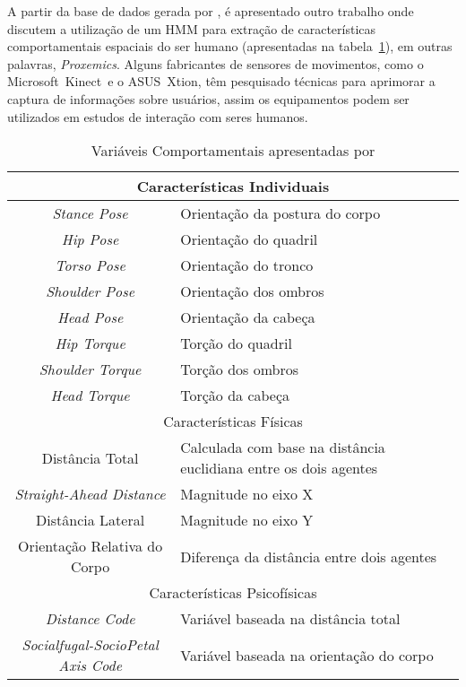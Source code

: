 A partir da base de dados gerada por \textcite{mead:2013b}, é apresentado outro trabalho onde \textcite{mead:2013} discutem a utilização de um HMM para extração de características comportamentais espaciais do ser humano (apresentadas na tabela~\ref{tab:variaveiscomportamentaismead}), em outras palavras, \emph{Proxemics}. Alguns fabricantes de sensores de movimentos, como o Microsoft\textregistered\ Kinect\textregistered\ e o ASUS\textregistered\ Xtion, têm pesquisado técnicas para aprimorar a captura de informações sobre usuários, assim os equipamentos podem ser utilizados em estudos de interação com seres humanos.

\begin{table}[!ht]
	\caption{Variáveis Comportamentais apresentadas por \textcite{mead:2013b}}
	\label{tab:variaveiscomportamentaismead}
	\centering
	\begin{tabular}{c | p{8 cm}}
		\hline
		\multicolumn{2}{c}{Características Individuais} \\
		\hline
		\emph{Stance Pose} & Orientação da postura do corpo \\
		\hline
		\emph{Hip Pose} & Orientação do quadril \\
		\hline
		\emph{Torso Pose} & Orientação do tronco \\
		\hline
		\emph{Shoulder Pose} & Orientação dos ombros \\
		\hline
		\emph{Head Pose} & Orientação da cabeça \\
		\hline
		\emph{Hip Torque} & Torção do quadril \\
		\hline
		\emph{Shoulder Torque} & Torção dos ombros \\
		\hline
		\emph{Head Torque} & Torção da cabeça \\
		\hline
		\multicolumn{2}{c}{Características Físicas} \\
		\hline
		Distância Total & Calculada com base na distância euclidiana entre os dois agentes \\
		\hline
		\emph{Straight-Ahead Distance} & Magnitude no eixo X \\
		\hline
		Distância Lateral & Magnitude no eixo Y \\
		\hline
		Orientação Relativa do Corpo & Diferença da distância entre dois agentes \\
		\hline
		\multicolumn{2}{c}{Características Psicofísicas} \\
		\hline
		\emph{Distance Code} & Variável baseada na distância total \\
		\hline
		\emph{Socialfugal-SocioPetal Axis Code} & Variável baseada na orientação do corpo \\

\end{tabular}
\end{table}

